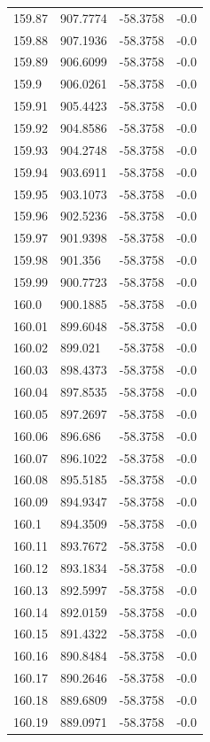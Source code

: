 \begin{table}[H]
\begin{tabular}{llll}
159.87 & 907.7774 & -58.3758 & -0.0 \\
159.88 & 907.1936 & -58.3758 & -0.0 \\
159.89 & 906.6099 & -58.3758 & -0.0 \\
159.9 & 906.0261 & -58.3758 & -0.0 \\
159.91 & 905.4423 & -58.3758 & -0.0 \\
159.92 & 904.8586 & -58.3758 & -0.0 \\
159.93 & 904.2748 & -58.3758 & -0.0 \\
159.94 & 903.6911 & -58.3758 & -0.0 \\
159.95 & 903.1073 & -58.3758 & -0.0 \\
159.96 & 902.5236 & -58.3758 & -0.0 \\
159.97 & 901.9398 & -58.3758 & -0.0 \\
159.98 & 901.356 & -58.3758 & -0.0 \\
159.99 & 900.7723 & -58.3758 & -0.0 \\
160.0 & 900.1885 & -58.3758 & -0.0 \\
160.01 & 899.6048 & -58.3758 & -0.0 \\
160.02 & 899.021 & -58.3758 & -0.0 \\
160.03 & 898.4373 & -58.3758 & -0.0 \\
160.04 & 897.8535 & -58.3758 & -0.0 \\
160.05 & 897.2697 & -58.3758 & -0.0 \\
160.06 & 896.686 & -58.3758 & -0.0 \\
160.07 & 896.1022 & -58.3758 & -0.0 \\
160.08 & 895.5185 & -58.3758 & -0.0 \\
160.09 & 894.9347 & -58.3758 & -0.0 \\
160.1 & 894.3509 & -58.3758 & -0.0 \\
160.11 & 893.7672 & -58.3758 & -0.0 \\
160.12 & 893.1834 & -58.3758 & -0.0 \\
160.13 & 892.5997 & -58.3758 & -0.0 \\
160.14 & 892.0159 & -58.3758 & -0.0 \\
160.15 & 891.4322 & -58.3758 & -0.0 \\
160.16 & 890.8484 & -58.3758 & -0.0 \\
160.17 & 890.2646 & -58.3758 & -0.0 \\
160.18 & 889.6809 & -58.3758 & -0.0 \\
160.19 & 889.0971 & -58.3758 & -0.0 \\

\end{tabular}
\end{table}
